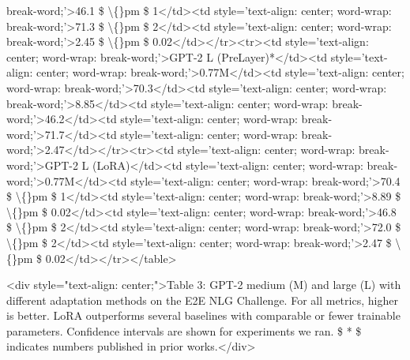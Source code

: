 \documentclass[conference]{IEEEtran}
\begin{document}
break-word;'\textgreater{}46.1  \$ \textbackslash\{\}pm \$ 1\textless{}/td\textgreater{}\textless{}td style='text-align: center; word-wrap: break-word;'\textgreater{}71.3  \$ \textbackslash\{\}pm \$ 2\textless{}/td\textgreater{}\textless{}td style='text-align: center; word-wrap: break-word;'\textgreater{}2.45  \$ \textbackslash\{\}pm \$ 0.02\textless{}/td\textgreater{}\textless{}/tr\textgreater{}\textless{}tr\textgreater{}\textless{}td style='text-align: center; word-wrap: break-word;'\textgreater{}GPT-2 L (PreLayer)*\textless{}/td\textgreater{}\textless{}td style='text-align: center; word-wrap: break-word;'\textgreater{}0.77M\textless{}/td\textgreater{}\textless{}td style='text-align: center; word-wrap: break-word;'\textgreater{}70.3\textless{}/td\textgreater{}\textless{}td style='text-align: center; word-wrap: break-word;'\textgreater{}8.85\textless{}/td\textgreater{}\textless{}td style='text-align: center; word-wrap: break-word;'\textgreater{}46.2\textless{}/td\textgreater{}\textless{}td style='text-align: center; word-wrap: break-word;'\textgreater{}71.7\textless{}/td\textgreater{}\textless{}td style='text-align: center; word-wrap: break-word;'\textgreater{}2.47\textless{}/td\textgreater{}\textless{}/tr\textgreater{}\textless{}tr\textgreater{}\textless{}td style='text-align: center; word-wrap: break-word;'\textgreater{}GPT-2 L (LoRA)\textless{}/td\textgreater{}\textless{}td style='text-align: center; word-wrap: break-word;'\textgreater{}0.77M\textless{}/td\textgreater{}\textless{}td style='text-align: center; word-wrap: break-word;'\textgreater{}70.4  \$ \textbackslash\{\}pm \$ 1\textless{}/td\textgreater{}\textless{}td style='text-align: center; word-wrap: break-word;'\textgreater{}8.89  \$ \textbackslash\{\}pm \$ 0.02\textless{}/td\textgreater{}\textless{}td style='text-align: center; word-wrap: break-word;'\textgreater{}46.8  \$ \textbackslash\{\}pm \$ 2\textless{}/td\textgreater{}\textless{}td style='text-align: center; word-wrap: break-word;'\textgreater{}72.0  \$ \textbackslash\{\}pm \$ 2\textless{}/td\textgreater{}\textless{}td style='text-align: center; word-wrap: break-word;'\textgreater{}2.47  \$ \textbackslash\{\}pm \$ 0.02\textless{}/td\textgreater{}\textless{}/tr\textgreater{}\textless{}/table\textgreater{}

\textless{}div style="text-align: center;"\textgreater{}Table 3: GPT-2 medium (M) and large (L) with different adaptation methods on the E2E NLG Challenge. For all metrics, higher is better. LoRA outperforms several baselines with comparable or fewer trainable parameters. Confidence intervals are shown for experiments we ran.  \$ * \$ indicates numbers published in prior works.\textless{}/div\textgreater{}
\end{document}
